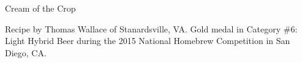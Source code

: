 \begin{recipe}{Cream of the Crop}

\begin{aboutblock}
Recipe by Thomas Wallace of Stanardsville, VA. Gold medal in Category \#6: Light
Hybrid Beer during the 2015 National Homebrew Competition in San Diego, CA.
\sourceaha
\end{aboutblock}


\begin{methodandtiming}

\begin{mashsteps}
\end{mashsteps}

\begin{fermentationsteps}
\end{fermentationsteps}

\end{methodandtiming}

\recipebreak

\begin{ingredientsblock}

\begin{malts}
\end{malts}

\begin{hops}
\end{hops}


\end{ingredientsblock}

\end{recipe}

